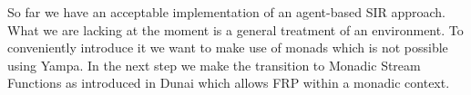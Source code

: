 So far we have an acceptable implementation of an agent-based SIR approach. What we are lacking at the moment is a general treatment of an environment. To conveniently introduce it we want to make use of monads which is not possible using Yampa. In the next step we make the transition to Monadic Stream Functions as introduced in Dunai \cite{perez_functional_2016} which allows FRP within a monadic context.
